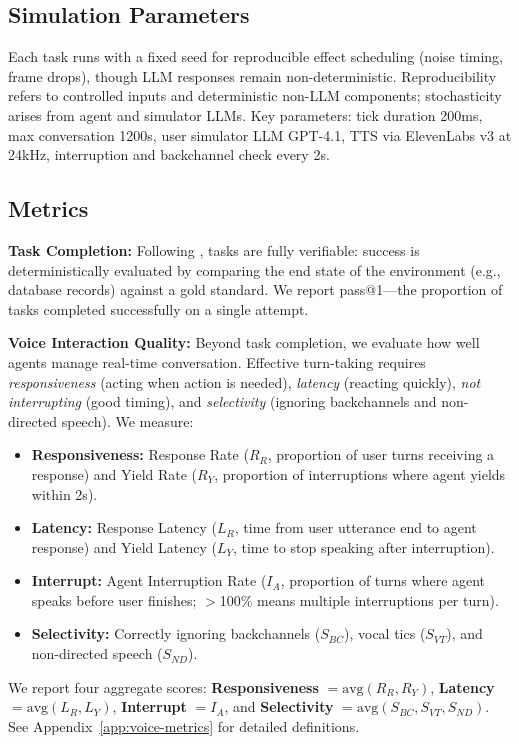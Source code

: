 \subsection{Simulation Parameters}

Each task runs with a fixed seed for reproducible effect scheduling (noise timing, frame drops), though LLM responses remain non-deterministic. Reproducibility refers to controlled inputs and deterministic non-LLM components; stochasticity arises from agent and simulator LLMs. Key parameters: tick duration 200ms, max conversation 1200s, user simulator LLM GPT-4.1, TTS via ElevenLabs v3 at 24kHz, interruption and backchannel check every 2s. 

\subsection{Metrics}

\textbf{Task Completion:} Following \tautwobench{}, tasks are fully verifiable: success is deterministically evaluated by comparing the end state of the environment (e.g., database records) against a gold standard. We report pass@1---the proportion of tasks completed successfully on a single attempt.

\textbf{Voice Interaction Quality:} Beyond task completion, we evaluate how well agents manage real-time conversation. Effective turn-taking requires \textit{responsiveness} (acting when action is needed), \textit{latency} (reacting quickly), \textit{not interrupting} (good timing), and \textit{selectivity} (ignoring backchannels and non-directed speech). We measure:
\begin{itemize}[nosep,leftmargin=*]
    \item \textbf{Responsiveness:} Response Rate ($R_R$, proportion of user turns receiving a response) and Yield Rate ($R_Y$, proportion of interruptions where agent yields within 2s).
    \item \textbf{Latency:} Response Latency ($L_R$, time from user utterance end to agent response) and Yield Latency ($L_Y$, time to stop speaking after interruption).
    \item \textbf{Interrupt:} Agent Interruption Rate ($I_A$, proportion of turns where agent speaks before user finishes; $>$100\% means multiple interruptions per turn).
    \item \textbf{Selectivity:} Correctly ignoring backchannels ($S_{BC}$), vocal tics ($S_{VT}$), and non-directed speech ($S_{ND}$).
\end{itemize}
We report four aggregate scores: \textbf{Responsiveness} $= \mathrm{avg}(R_R, R_Y)$, \textbf{Latency} $= \mathrm{avg}(L_R, L_Y)$, \textbf{Interrupt} $= I_A$, and \textbf{Selectivity} $= \mathrm{avg}(S_{BC}, S_{VT}, S_{ND})$. See Appendix~\ref{app:voice-metrics} for detailed definitions.
